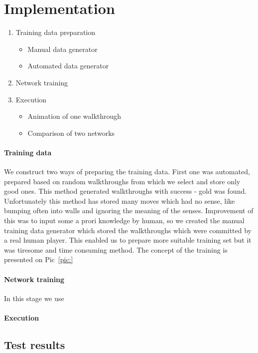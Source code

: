 \documentclass[a4paper]{article}
\begin{document}
\section{Implementation }
		\begin{enumerate}
		\item Training data preparation
			\begin{itemize}
				\item Manual data generator 
				\item Automated data generator
			\end{itemize}
		\item Network training 
		\item Execution
			\begin{itemize}
				\item Animation of one walkthrough
				\item Comparison of two networks 
			\end{itemize}
	\end{enumerate}
	
	\paragraph{Training data}
	We construct two ways of preparing the training data. First one was automated, prepared 
	based on random walkthroughs from which we select and store only good ones. This method
	 generated walkthroughs with success - gold was found. Unfortunately this method has stored 
	 many moves which had no sense, like bumping often into walls and ignoring the meaning 
	 of the senses.  
	 Improvement of this was to input some a prori knowledge by human, so we created the manual
	 training data generator which stored the walkthroughs which were committed by a real human player.
	 This enabled us to prepare more suitable training set but it was tiresome and time consuming method.
	 The concept of the training is presented on Pic~\ref{pic:}
	 
	\paragraph{Network training}
	In this stage we use
	\paragraph{Execution}

	

\subsection{Test results}
\end{document}
